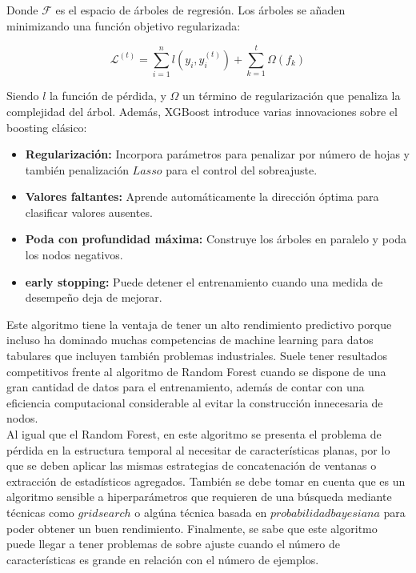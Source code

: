 Donde $\mathcal{F}$ es el espacio de árboles de regresión. Los árboles se añaden minimizando una función objetivo regularizada:

\[
\mathcal{L}^{(t)} = \sum_{i=1}^{n} l\left(y_i, \hat{y}_i^{(t)}\right) + \sum_{k=1}^{t} \Omega(f_k)
\]

Siendo $l$ la función de pérdida, y $\Omega$ un término de regularización que penaliza la complejidad del árbol. Además, XGBoost introduce varias innovaciones sobre el boosting clásico:

\begin{itemize}
    \item \textbf{Regularización:} Incorpora parámetros para penalizar por número de hojas y también penalización $Lasso$ para el control del sobreajuste.

    \item \textbf{Valores faltantes:} Aprende automáticamente la dirección óptima para clasificar valores ausentes.

    \item \textbf{Poda con profundidad máxima:} Construye los árboles en paralelo y poda los nodos negativos.

    \item \textbf{early stopping:} Puede detener el entrenamiento cuando una medida de desempeño deja de mejorar.
\end{itemize}

Este algoritmo tiene la ventaja de tener un alto rendimiento predictivo porque incluso ha dominado muchas competencias de machine learning para datos tabulares que incluyen también problemas industriales. Suele tener resultados competitivos frente al algoritmo de Random Forest cuando se dispone de una gran cantidad de datos para el entrenamiento, además de contar con una eficiencia computacional considerable al evitar la construcción innecesaria de nodos.\\[.15cm]

Al igual que el Random Forest, en este algoritmo se presenta el problema de pérdida en la estructura temporal al necesitar de características planas, por lo que se deben aplicar las mismas estrategias de concatenación de ventanas o extracción de estadísticos agregados. También se debe tomar en cuenta que es un algoritmo sensible a hiperparámetros que requieren de una búsqueda mediante técnicas como $grid search$ o algúna técnica basada en $probabilidad bayesiana$ para poder obtener un buen rendimiento. Finalmente, se sabe que este algoritmo puede llegar a tener problemas de sobre ajuste cuando el número de características es grande en relación con el número de ejemplos.\\[.15cm]

